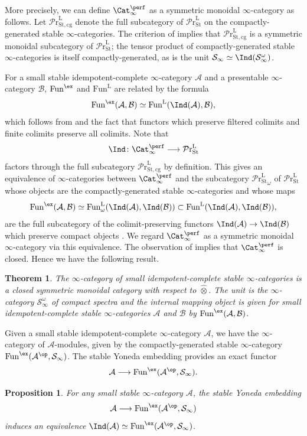 \documentclass{amsart}
\newcommand{\htp}{\simeq}
\renewcommand{\to}{\mathchoice{\longrightarrow}{\rightarrow}{\rightarrow}{\rightarrow}}
\let\catsymbfont\mathcal
\newcommand{\aA}{{\catsymbfont{A}}}
\newcommand{\aB}{{\catsymbfont{B}}}
\newcommand{\aS}{{\catsymbfont{S}}}
\renewcommand{\L}{\mathrm{L}}
\newcommand{\idemstabcat}{\Cat_\i^{\perf}}
\newcommand{\idemtimes}{\widehat{\otimes}}
\newcommand{\stabprcat}{{{\mathcal{P}\mathrm{r}}^{\mathrm{L}}_\mathrm{St}}}
\newcommand{\stabprcatcg}{{{\mathcal{P}\mathrm{r}}^{\mathrm{L}}_\mathrm{St,cg}}}
\newcommand{\Fun}{\mathrm{Fun}} %
\newcommand{\ispec}{\aS_{\infty}}
\renewcommand{\i}{\infty}
\numberwithin{equation}{section}
\newtheorem{theorem}[equation]{Theorem}
\newtheorem{proposition}[equation]{Proposition}
\theoremstyle{definition}
\begin{document}
More precisely, we can define $\idemstabcat$ as a symmetric monoidal
$\i$-category as follows.  Let $\stabprcatcg$ denote the full
subcategory of $\stabprcat$ on the compactly-generated stable
$\infty$-categories.  The criterion of \cite[2.2.1.2]{HAG} implies
that $\stabprcatcg$ is a symmetric monoidal subcategory of
$\stabprcat$; the tensor product of compactly-generated stable
$\infty$-categories is itself compactly-generated, as is the unit
$\ispec\simeq\Ind(\ispec^\omega)$.

For a small stable idempotent-complete $\i$-category $\aA$ and a
presentable $\i$-category $\aB$, $\Fun^{\ex}$ and $\Fun^{\L}$ are
related by the formula
\[
\Fun^{\ex}(\aA, \aB) \htp \Fun^{\L}(\Ind(\aA), \aB),
\]
which follows from \cite[5.3.5.10]{HTT} and the fact that functors
which preserve filtered colimits and finite colimits preserve all
colimits.
Note that 
\[
\Ind \colon \idemstabcat\to\stabprcat
\]
factors through the full subcategory $\stabprcatcg$ by
definition.  This gives an equivalence of $\infty$-categories
between $\idemstabcat$ and the subcategory $\stabprcat_\omega$ of
$\stabprcat$ whose objects are the compactly-generated stable
$\infty$-categories and whose maps
\[
\Fun^{\ex}(\aA,\aB)\simeq\Fun^{\L}_\omega(\Ind(\aA),\Ind(\aB))\subset\Fun^{\L}(\Ind(\aA),\Ind(\aB)), 
\]
are the full subcategory of the colimit-preserving functors
$\Ind(\aA)\to\Ind(\aB)$ which preserve compact
objects \cite[5.5.7.10]{HTT}.  We regard $\idemstabcat$ as a symmetric 
monoidal $\i$-category via this equivalence.  The observation
of \cite[6.3.1.17]{HAG} implies that $\idemstabcat$ is closed.  Hence
we have the following result.

\begin{theorem}\label{thm:idemsymm}
The $\i$-category of small idempotent-complete stable $\i$-categories is a
closed symmetric monoidal category with respect to $\idemtimes$.
The unit is the $\i$-category $\ispec^{\omega}$ of compact spectra and the
internal mapping object is given for small idempotent-complete stable
$\i$-categories $\aA$ and $\aB$ by $\Fun^{\ex}(\aA, \aB)$.
\end{theorem}

Given a small stable idempotent-complete $\i$-category $\aA$, we have
the $\i$-category of $\aA$-modules, given by the compactly-generated stable
$\i$-category $\Fun^{\ex}(\aA^{\op},\ispec)$.  
The stable Yoneda embedding provides an exact functor \cite[5.3.5.2]{HTT}
\[
\aA \to \Fun^{\ex}(\aA^{\op},\ispec).
\]

\begin{proposition}\label{prop:idempotentchar}
For any small stable $\i$-category $\aA$, the stable Yoneda embedding
\[
\aA\longrightarrow\Fun^{\ex}(\aA^{\op},\ispec)
\]
induces an equivalence $\Ind(\aA)\simeq\Fun^{\ex}(\aA^{\op},\ispec)$.
\end{proposition}
\end{document}
